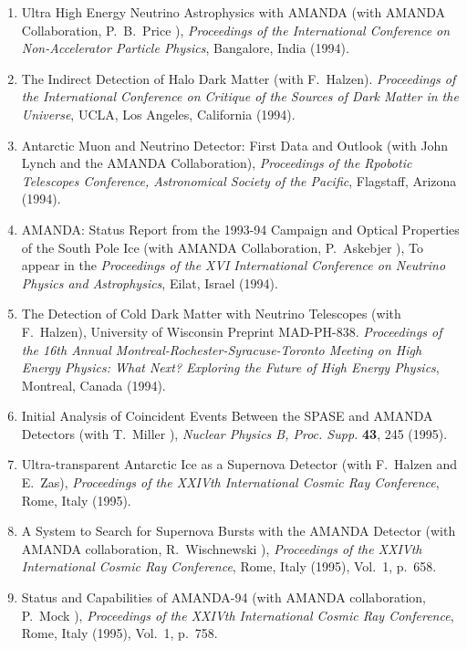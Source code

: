 \begin{enumerate}
\item Ultra High Energy Neutrino Astrophysics with AMANDA (with AMANDA
  Collaboration, P.~B.~Price \etal), {\it Proceedings of the
    International Conference on Non-Accelerator Particle Physics},
  Bangalore, India (1994).

\item The Indirect Detection of Halo Dark Matter (with F.~Halzen).
  {\it Proceedings of the International Conference on Critique of the
    Sources of Dark Matter in the Universe}, UCLA, Los Angeles,
  California (1994).

\item Antarctic Muon and Neutrino Detector: First Data and Outlook
  (with John Lynch and the AMANDA Collaboration), {\it Proceedings of
  the Rpobotic Telescopes Conference, Astronomical Society of the
  Pacific}, Flagstaff, Arizona (1994).

\item AMANDA: Status Report from the 1993-94 Campaign and Optical
  Properties of the South Pole Ice (with AMANDA Collaboration,
  P.~Askebjer \etal), To appear in the {\it Proceedings of the XVI
    International Conference on Neutrino Physics and Astrophysics},
  Eilat, Israel (1994).

\item The Detection of Cold Dark Matter with Neutrino Telescopes (with
  F.~Halzen), University of Wisconsin Preprint MAD-PH-838.  {\it
    Proceedings of the 16th Annual Montreal-Rochester-Syracuse-Toronto
    Meeting on High Energy Physics: What Next? Exploring the Future of
    High Energy Physics}, Montreal, Canada (1994).

\item Initial Analysis of Coincident Events Between the SPASE and
  AMANDA Detectors (with T.~Miller \etal), {\it Nuclear Physics B,
    Proc. Supp.} {\bf 43}, 245 (1995).

\item Ultra-transparent Antarctic Ice as a Supernova Detector (with
  F.~Halzen and E.~Zas), {\it Proceedings of the XXIVth International
    Cosmic Ray Conference}, Rome, Italy (1995).

\item A System to Search for Supernova Bursts with the AMANDA Detector
  (with AMANDA collaboration, R.~Wischnewski \etal), {\it Proceedings
  of the XXIVth International Cosmic Ray Conference}, Rome, Italy
  (1995), Vol.~1, p.~658.

\item Status and Capabilities of AMANDA-94 (with AMANDA collaboration,
  P.~Mock \etal), {\it Proceedings of the XXIVth International Cosmic
    Ray Conference}, Rome, Italy (1995), Vol.~1, p.~758.


\end{enumerate}
